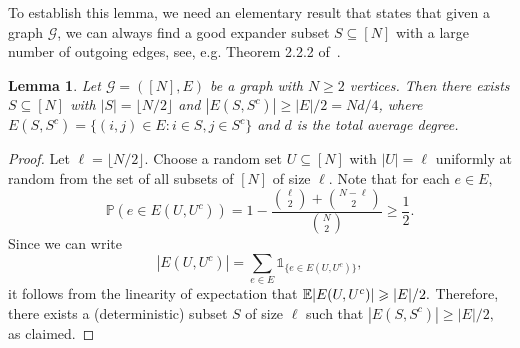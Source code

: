 \documentclass[letterpaper,11pt,reqno]{amsart}
\newtheorem{lem}[thm]{Lemma}
\renewcommand{\le}{\leqslant}
\renewcommand{\ge}{\geqslant}
\newcommand{\ind}{\mathds{1}}
\newcommand{\abs}[1]{\left\vert#1\right\vert}
\newcommand{\cG}{\mathcal{G}}\newcommand{\cH}{\mathcal{H}}\newcommand{\cI}{\mathcal{I}}
\newcommand{\bP}{\mathbb{P}}\newcommand{\bQ}{\mathbb{Q}}\newcommand{\bR}{\mathbb{R}}
\begin{document}


To establish this lemma, we need an elementary result that states that given a graph $\cG$, we can always find a good expander subset $S \subseteq [N]$ with a large number of outgoing edges, see, e.g. Theorem 2.2.2 of~\cite{AS08}.
\begin{lem}\label{lem:bipar}
     Let $\cG=([N],E)$ be a graph with $N \ge 2$ vertices. Then there exists $ S\subseteq [N]$ with $|S| = \lfloor {N}/{2} \rfloor$ and $\abs{E(S,S^c)}\ge \abs{E}/{2} = {Nd}/{4}$, where
     $E(S,S^c) = \{ (i ,j) \in E: i \in S, j \in S^c \}$ and  $d$ is the total average degree.
 \end{lem}
\begin{proof}
Let $\ell = \lfloor {N}/{2} \rfloor$. Choose a random set $U \subseteq [N]$ with $|U| = \ell$ uniformly at random from the set of all subsets of $[N]$ of size $\ell$. 
Note that for each $e\in E,$
\[
\bP(e\in E(U, U^c))  = 1 - \frac{{\binom{\ell}{2}}+ {\binom{N-\ell}{2}}}{{\binom{N}{2}}} \ge \frac{1}{2}.
\]
Since we can write 
\[ | E(U, U^c)|  = \sum_{e \in E} \ind_{\{  e \in E(U, U^c)\} }, \]
it follows from the linearity of expectation that  $\bE | E(U, U^c)|  \ge |E|/2. $  Therefore, there exists a (deterministic) subset $S$ of size $\ell$ such that $| E(S, S^c)| \ge |E|/2, $ as claimed.
\end{proof}
\end{document}
